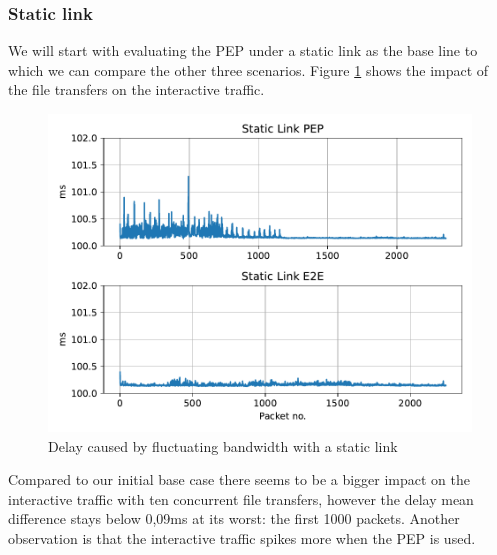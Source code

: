 \documentclass[a4paper,english, 11pt]{report}
\begin{document}
\subsubsection{Static link}
We will start with evaluating the PEP under a static link as the base line to which we can compare the other three scenarios. Figure \ref{fig:witestlab_static_delay} shows the impact of the file transfers on the interactive traffic.\\

\begin{figure}[h!] %
	\centering
	\includegraphics[scale=0.50]{../diagrams/witestlab/staticlink.pdf}
  	\caption{Delay caused by fluctuating bandwidth with a static link}
  	\label{fig:witestlab_static_delay}
\end{figure}

Compared to our initial base case there seems to be a bigger impact on the interactive traffic with ten concurrent file transfers, however the delay mean difference stays below 0,09ms at its worst: the first 1000 packets. Another observation is that the interactive traffic spikes more when the PEP is used.\\
\end{document}
